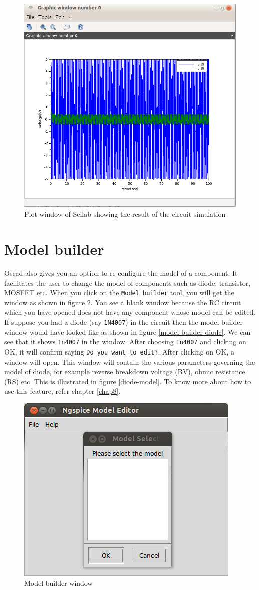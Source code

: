 \begin{figure}
\begin{center}
\includegraphics[width=0.5\linewidth]{figures/scilabFig.png}
\caption{Plot window of Scilab showing the result of the circuit simulation}
\label{scilab-plot}
\end{center}
\end{figure}


\section{Model builder}

Oscad also gives you an option to re-configure the model of a component. It facilitates the user to change the model of components such as diode, transistor, MOSFET etc. When you click on the {\tt Model builder} tool, you will get the window as shown in figure \ref{model-builder-blank}. You see a blank window because the RC  circuit which you have opened does not have any component whose model can be edited. If suppose you had a diode (say {\tt 1N4007}) in the circuit then the model builder window would have looked like as shown in figure \ref{model-builder-diode}. We can see that it shows {\tt 1n4007} in the window. After choosing {\tt 1n4007} and clicking on OK, it will confirm saying {\tt Do you want to edit?}. After clicking on OK, a window will open. This window will contain the various parameters governing the model of diode, for example reverse breakdown voltage (BV), ohmic resistance (RS) etc. This is illustrated in figure \ref{diode-model}. To know more about how to use this feature, refer chapter \ref{chap8}.

\begin{figure}
\begin{center}
\includegraphics[width=0.5\linewidth]{figures/model-builder.png}
\caption{Model builder window}
\label{model-builder-blank}
\end{center}
\end{figure}

